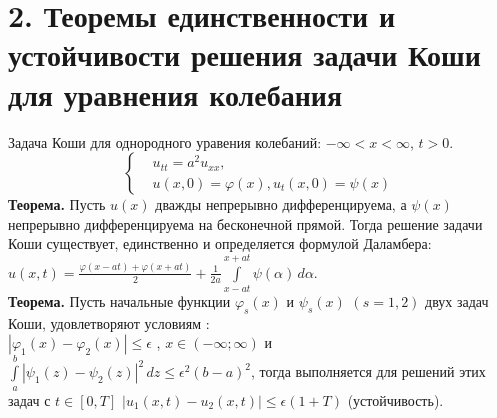 \documentclass[11pt,a4paper]{article}
\begin{document}
    \section*{2. Теоремы единственности и устойчивости решения задачи Коши для уравнения колебания}
    Задача Коши для однородного уравения колебаний: $-\infty<x<\infty$, $t>0$.
    \[ \left\{\begin{aligned}
    &u_{tt}=a^2u_{xx}, \\ & u(x,0)=\varphi(x), u_t(x,0)=\psi(x)
    \end{aligned}\right. \]
    \textbf{Теорема.}
    Пусть $u(x)$ дважды непрерывно дифференцируема, а $\psi(x)$ непрерывно дифференцируема на бесконечной прямой. Тогда решение задачи Коши существует, единственно и определяется формулой Даламбера:\\ $u(x,t)=\frac{\varphi(x-at)+\varphi(x+at)}{2}+\frac{1}{2a}\int\limits_{x-at}^{x+at} \psi(\alpha) \,d\alpha$.
    \\
    \textbf{Теорема.}
    Пусть начальные функции $\varphi_s(x)$ и $\psi_s(x)$ $(s=1,2)$ двух задач Коши, удовлетворяют условиям :\\
    $|\varphi_1(x)-\varphi_2(x)|\leq \epsilon$ , $x\in (-\infty ; \infty)$
    и $\int\limits_a^b |\psi_1(z)-\psi_2(z)|^2 \,dz \leq \epsilon^2(b-a)^2 $,
    тогда выполняется для решений этих задач с $t\in[0,T]$ $|u_1(x,t)-u_2(x,t)|\leq\epsilon(1+T)$ (устойчивость).
    
\end{document}
